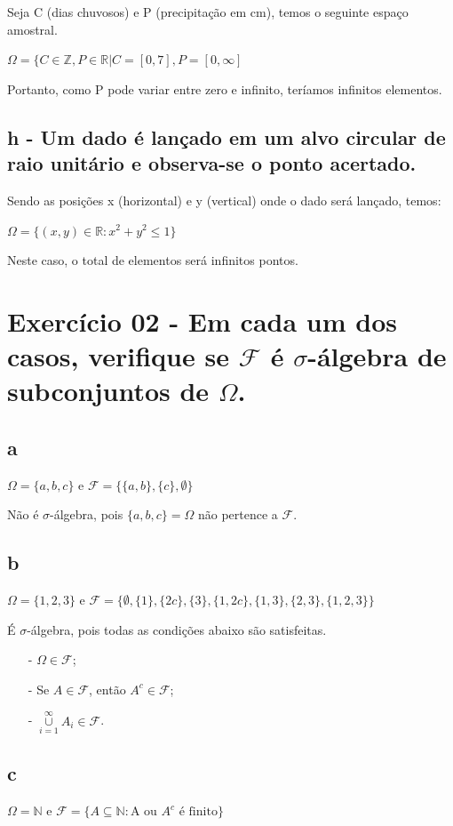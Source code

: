 \documentclass[12pt]{article}
\begin{document}
Seja C (dias chuvosos) e P (precipitação em cm), temos o seguinte espaço amostral.

$\Omega = \{C \in \mathbb{Z}, P \in \mathbb{R} | C=[0,7], P=[0,\infty]$

Portanto, como P pode variar entre zero e infinito, teríamos infinitos elementos.

\subsection*{h - Um dado é lançado em um alvo circular de raio unitário e observa-se o ponto acertado.}

Sendo as posições x (horizontal) e y (vertical) onde o dado será lançado, temos:

$\Omega = \{ (x,y) \in \mathbb{R} : x^2 + y^2 \leq 1 \}$

Neste caso, o total de elementos será infinitos pontos.

\section*{Exercício 02 - Em cada um dos casos, verifique se $\mathcal{F}$ é $\sigma$-álgebra de subconjuntos de $\Omega$.}

\subsection*{a}
$\Omega = \{ a,b,c\}$ e $\mathcal{F}=\{\{a,b\}, \{c\}, \emptyset \}$

Não é $\sigma$-álgebra, pois $\{a,b,c\}=\Omega$ não pertence a $\mathcal{F}$.

\subsection*{b}
$\Omega = \{ 1,2,3\}$ e $\mathcal{F}= \{\emptyset, \{1\}, \{2c\}, \{3\}, \{1,2c\}, \{1,3\}, \{2,3\}, \{1,2,3\} \}$

É $\sigma$-álgebra, pois todas as condições abaixo são satisfeitas.

\begin{itemize}
\item[-] $\Omega \in \mathcal{F}$;
\item[-] Se $A \in \mathcal{F}$, então $A^c \in \mathcal{F}$;
\item[-] $\overset{\infty}{\underset{i=1}{\cup}} A_i \in \mathcal{F}$.
\end{itemize}

\subsection*{c}
$\Omega = \mathbb{N}$ e $\mathcal{F}=\{ A \subseteq \mathbb{N}: \text{A ou } A^c \text{ é finito} \}$
\end{document}
